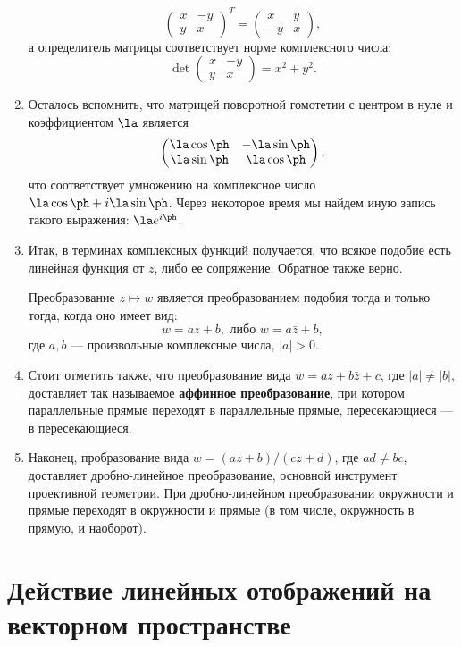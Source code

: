 \begin{enumerate}
$$
\begin{pmatrix}
x & -y \\ y & x
\end{pmatrix}^T =
\begin{pmatrix}
x & y \\ -y & x
\end{pmatrix},
$$
а определитель матрицы соответствует норме комплексного числа:
$$
\det \begin{pmatrix}
x & -y \\ y & x
\end{pmatrix} = 
x^2+y^2.
$$

\item Осталось вспомнить, что матрицей поворотной гомотетии с центром в нуле и коэффициентом $\la$ является
$$
\begin{pmatrix}
\la\cos\ph & -\la\sin\ph \\ \la\sin\ph & \la\cos\ph
\end{pmatrix},
$$
что соответствует умножению на комплексное число $\la\cos\ph + i\la\sin\ph$. Через некоторое время мы найдем иную запись такого выражения: $\la e^{i\ph}$.
\item Итак, в терминах комплексных функций получается, что всякое подобие есть линейная функция от $z$, либо ее сопряжение. Обратное также верно.
\begin{thrm} Преобразование $z\mapsto w$ является преобразованием подобия тогда и только тогда, когда оно имеет вид:
$$
w = az+b,\mbox{ либо }w = a\bar z+b,
$$
где $a,b$ --- произвольные комплексные числа, $|a|>0$.
\end{thrm}

\item Стоит отметить также, что преобразование вида $w=az+b\bar z+c$, где $|a|\ne|b|$, доставляет так называемое \textbf{аффинное преобразование}, при котором параллельные прямые переходят в параллельные прямые, пересекающиеся --- в пересекающиеся.

\item Наконец, пробразование вида $w=(az+b)/(cz+d)$, где $ad\ne bc$, доставляет дробно-линейное преобразование, основной инструмент проективной геометрии. При дробно-линейном преобразовании окружности и прямые переходят в окружности и прямые (в том числе, окружность в прямую, и наоборот).

\end{enumerate}





\section{Действие линейных отображений на векторном пространстве}

